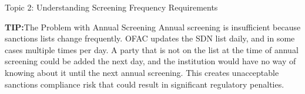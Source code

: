 \documentclass[8pt]{beamer}  %
\newcommand{\tip}{\textcolor{infoblue}{\textbf{TIP:}}}
\begin{document}
\begin{frame}{Topic 2: Understanding Screening Frequency Requirements}
		\vspace{0.2cm}
		\begin{block}{\large \tip The Problem with Annual Screening}
			Annual screening is insufficient because sanctions lists change frequently. OFAC updates the SDN list daily, and in some cases multiple times per day. A party that is not on the list at the time of annual screening could be added the next day, and the institution would have no way of knowing about it until the next annual screening. This creates unacceptable sanctions compliance risk that could result in significant regulatory penalties.
		\end{block}
	\end{frame}
	
\end{document}
